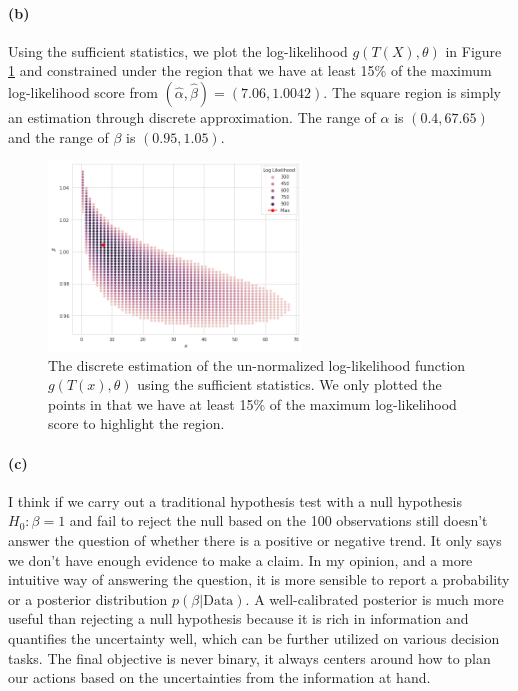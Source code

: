 \documentclass[11pt, letterpaper]{article}
\begin{document}
\paragraph{(b)}
Using the sufficient statistics, we plot the log-likelihood $g(T(X), \theta)$ in Figure \ref{fig:sufficient-logl} and constrained under the region that we have at least 15\% of the maximum log-likelihood score from $(\hat{\alpha}, \hat{\beta}) = (7.06, 1.0042)$. The square region is simply an estimation through discrete approximation. The range of $\alpha$ is $(0.4, 67.65)$ and the range of $\beta$ is $(0.95, 1.05)$.
\begin{figure}[!h]
  \centering
  \includegraphics[width=0.6\textwidth]{hw5-1.png}
  \captionsetup{justification=centering}
  \caption{The discrete estimation of the un-normalized log-likelihood function $g(T(x), \theta)$ using the sufficient statistics. We only plotted the points in that we have at least 15\% of the maximum log-likelihood score to highlight the region.}
  \label{fig:sufficient-logl}
\end{figure}

\paragraph{(c)}
I think if we carry out a traditional hypothesis test with a null hypothesis $H_0: \beta = 1$ and fail to reject the null based on the 100 observations still doesn't answer the question of whether there is a positive or negative trend. It only says we don't have enough evidence to make a claim. In my opinion, and a more intuitive way of answering the question, it is more sensible to report a probability or a posterior distribution $p(\beta|\text{Data})$. A well-calibrated posterior is much more useful than rejecting a null hypothesis because it is rich in information and quantifies the uncertainty well, which can be further utilized on various decision tasks. The final objective is never binary, it always centers around how to plan our actions based on the uncertainties from the information at hand.
\end{document}
